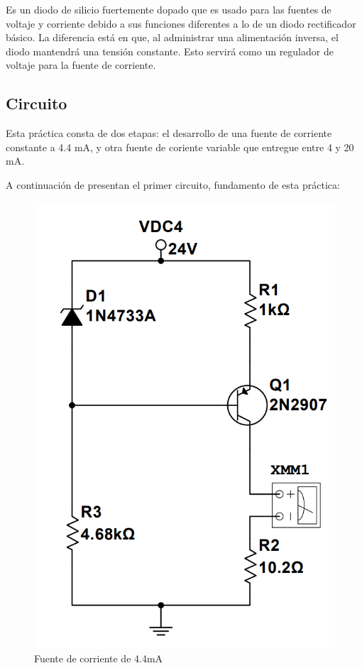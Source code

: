 Es un diodo de silicio fuertemente dopado que es usado para las fuentes de voltaje y corriente debido a sus funciones
diferentes a lo de un diodo rectificador básico. La diferencia está en que, al administrar una alimentación inversa,
el diodo mantendrá una tensión constante. Esto servirá como un regulador de voltaje para la fuente de corriente.

\subsection{Circuito}
Esta práctica consta de dos etapas: el desarrollo de una fuente de corriente constante a 4.4 mA, y otra fuente
 de coriente variable que entregue entre 4 y 20 mA.

A continuación de presentan el primer circuito, fundamento de esta práctica:
\begin{figure}[h]
    \centering
    \includegraphics[scale=0.35]{media/Screenshot 2022-05-25 012610.png}
    \caption{Fuente de corriente de 4.4mA}
    \label{Fig: Fuente de corriente de 4.4 mA}
\end{figure}

